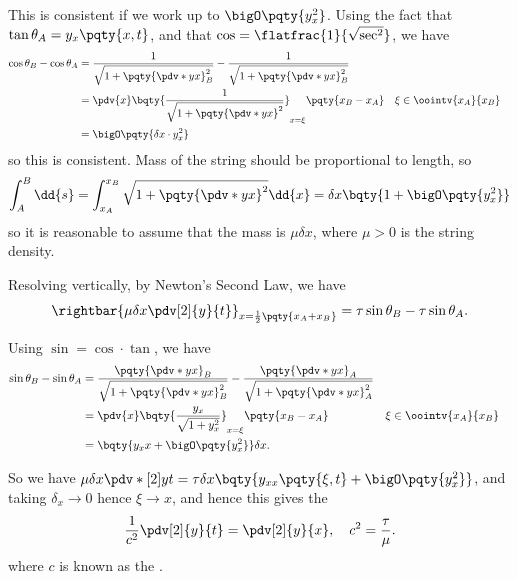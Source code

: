 {This is consistent if we work up to \(\bigO\pqty{y_x^2}\). Using the fact that \(\tan\theta_A = y_x\pqty{x, t}\), and that \(\cos = \flatfrac{1}{\sqrt{\sec^2}}\), we have
\begin{subequations}
    \begin{align}
        \cos \theta_B - \cos \theta_A &= \frac{1}{\sqrt{1 + \pqty{\pdv*{y}{x}}^2_{B}}} - \frac{1}{\sqrt{1 + \pqty{\pdv*{y}{x}}^2_{B}}} \\
        &= \pdv{x} \bqty{\frac{1}{\sqrt{1 + \pqty{\pdv*{y}{x}}^2}}}_{x = \xi} \pqty{x_B - x_A} && \xi \in \oointv{x_A}{x_B} \\
        &= \bigO \pqty{\delta x \cdot y_x^2}
    \end{align}
\end{subequations}
so this is consistent. Mass of the string should be proportional to length, so
\begin{equation}
    \int_{A}^{B} \dd{s} = \int_{x_A}^{x_B} \sqrt{1 + \pqty{\pdv*{y}{x}}^2} \dd{x} = \delta x \bqty{1 + \bigO\pqty{y_x^2}}
\end{equation}
so it is reasonable to assume that the mass is \(\mu \delta x\), where \(\mu > 0\) is the string density.

Resolving vertically, by Newton's Second Law, we have
\begin{equation}
    \rightbar{\mu \delta x \pdv[2]{y}{t}}_{x = \frac{1}{2} \pqty{x_A + x_B}} = \tau \sin \theta_B - \tau \sin \theta_A.
\end{equation}

Using \(\sin = \cos \cdot \tan\), we have
\begin{subequations}
    \begin{align}
        \sin \theta_B - \sin \theta_A &= \frac{\pqty{\pdv*{y}{x}}_B}{\sqrt{1 + \pqty{\pdv*{y}{x}}^2_B}} - \frac{\pqty{\pdv*{y}{x}}_A}{\sqrt{1 + \pqty{\pdv*{y}{x}}^2_A}} \\
        &= \pdv{x} \bqty{\frac{y_x}{\sqrt{1 + y_x^2}}}_{x = \xi} \pqty{x_B - x_A} && \xi \in \oointv{x_A}{x_B} \\
        &= \bqty{y_xx + \bigO\pqty{y_x^2}} \delta x.
    \end{align}
\end{subequations}

So we have \(\mu \delta x \pdv*[2]{y}{t} = \tau \delta x \bqty{y_{xx} \pqty{\xi, t} + \bigO\pqty{y_x^2}}\), and taking \(\delta_x \to 0\) hence \(\xi \to x\), and hence this gives the 
\begin{equation}
    \frac{1}{c^2} \pdv[2]{y}{t} = \pdv[2]{y}{x}, \quad c^2 = \frac{\tau}{\mu}.
\end{equation}
where \(c\) is known as the .

}
